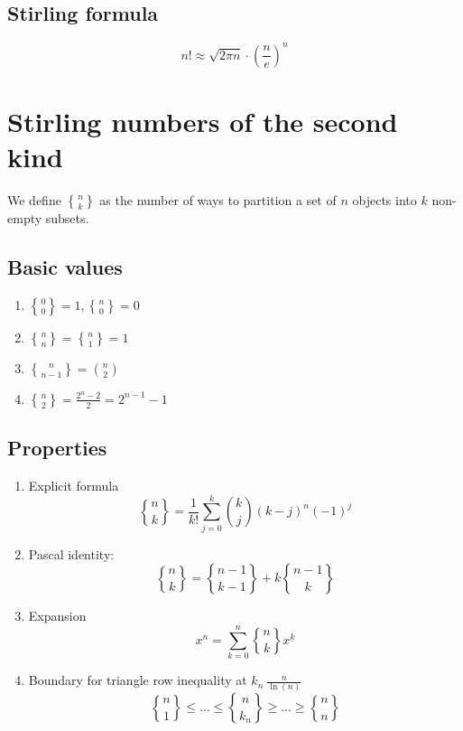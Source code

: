 \documentclass{article}
\begin{document}
\subsection{Stirling formula}

\[n! \approx \sqrt{2\pi n} \cdot \left(\frac{n}{e}\right)^n\]

\section{Stirling numbers of the second kind}

We define \( \genfrac\{\}{0pt}{1}{n}{k} \) as the number of ways to partition a set of $n$ objects into $k$ non-empty subsets.

\subsection{Basic values}

\begin{enumerate}
    \item \( \genfrac\{\}{0pt}{1}{0}{0} = 1, \genfrac\{\}{0pt}{1}{n}{0} = 0\)
    \item \( \genfrac\{\}{0pt}{1}{n}{n} = \genfrac\{\}{0pt}{1}{n}{1} = 1\)
    \item \( \genfrac\{\}{0pt}{1}{n}{n-1} = \binom{n}{2}\)
    \item \( \genfrac\{\}{0pt}{1}{n}{2} = \frac{2^n-2}{2} = 2^{n-1}-1\)
\end{enumerate}

\subsection{Properties}

\begin{enumerate}
    \item Explicit formula
    \[
    \genfrac\{\}{0pt}{0}{n}{k} = \frac{1}{k!} \sum_{j=0}^{k} \binom{k}{j} (k-j)^n (-1)^j 
    \]
    \item Pascal identity:
    \[
    \genfrac\{\}{0pt}{0}{n}{k} = \genfrac\{\}{0pt}{0}{n-1}{k-1} + k \genfrac\{\}{0pt}{0}{n-1}{k}
    \]
    \item Expansion
    \[
    x^n = \sum_{k=0}^{n} \genfrac\{\}{0pt}{0}{n}{k} x^{\underline{k}}
    \]
    \item Boundary for triangle row inequality at \(k_n ~ \frac{n}{\ln(n)}\)
    \[
    \genfrac\{\}{0pt}{0}{n}{1} \leq \dots \leq \genfrac\{\}{0pt}{0}{n}{k_n} \geq ... \geq \genfrac\{\}{0pt}{0}{n}{n}
    \]
\end{enumerate}
\end{document}
